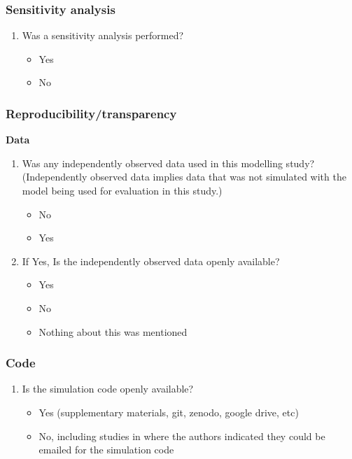 \documentclass[10pt,a4paper]{article}
\begin{document}
	\subsubsection{Sensitivity analysis}
	\begin{enumerate}[resume]
		\item Was a sensitivity analysis performed? 
		\begin{itemize}
			\item Yes
			\item No
		\end{itemize}
	\end{enumerate}
	
	
	\subsubsection{Reproducibility/transparency}
	\textbf{Data}
	\begin{enumerate}[resume]
		\item	Was any independently observed data used in this modelling study? (Independently observed data implies data that was not simulated with the model being used for evaluation in this study.)
		\begin{itemize}
			\item No
			\item	Yes 
		\end{itemize}
		\item	If Yes, Is the independently observed data openly available? 
		\begin{itemize}
			\item	Yes
			\item	No
			\item	Nothing about this was mentioned
		\end{itemize}
	\end{enumerate}
	
	\subsubsection{Code}
	\begin{enumerate}[resume]
		\item	Is the simulation code openly available?
		\begin{itemize}
			\item Yes (supplementary materials, git, zenodo, google drive, etc)
			\item No, including studies in where the authors indicated they could be emailed for the simulation code
		\end{itemize}
	\end{enumerate}
\end{document}
